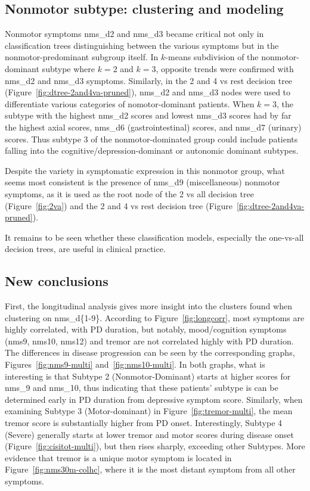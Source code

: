\documentclass[10pt]{article}
\begin{document}
\begin{multicols}{2}
\subsection{Nonmotor subtype: clustering and modeling}
Nonmotor symptoms nms\_d2 and nms\_d3 became critical not only in
classification trees distinguishing between the various symptoms but in the
nonmotor-predominant subgroup itself. In $k$-means subdivision of the
nonmotor-dominant subtype where $k = 2$ and $k = 3$, opposite trends were
confirmed with nms\_d2 and nms\_d3 symptoms. Similarly, in the 2 and 4 vs rest
decision tree (Figure~\ref{fig:dtree-2and4va-pruned}), nms\_d2 and nms\_d3 nodes were
used to differentiate various categories of nomotor-dominant patients.
When $k = 3$, the subtype with the highest nms\_d2 scores and lowest
nms\_d3 scores had by far the highest axial scores, nms\_d6 (gastrointestinal)
scores, and nms\_d7 (urinary) scores. Thus subtype 3 of the nonmotor-dominated
group could include patients falling into the cognitive/depression-dominant or
autonomic dominant subtypes.

Despite the variety in symptomatic expression in this nonmotor group, what
seems most consistent is the presence of nms\_d9 (miscellaneous) nonmotor
symptoms, as it is used as the root node of the 2 vs all decision tree
(Figure~\ref{fig:2va}) and the 2 and 4 vs rest decision tree
(Figure~\ref{fig:dtree-2and4va-pruned}).

It remains to be seen whether these classification models, especially the one-vs-all decision
trees, are useful in clinical practice.

\subsection{New conclusions}
\label{ssec:newconc}

First, the longitudinal analysis gives more insight into the clusters found when clustering on
nms\_d\{1-9\}. According to Figure~\ref{fig:longcorr}, most symptoms are highly correlated, with PD
duration, but notably, mood/cognition symptoms (nms9, nms10, nms12) and tremor are not correlated
highly with PD duration. The differences in disease progression can be seen by the corresponding
graphs, Figures~\ref{fig:nms9-multi} and~\ref{fig:nms10-multi}. In both graphs, what is interesting
is that Subtype 2 (Nonmotor-Dominant) starts at higher scores for nms\_9 and nms\_10, thus
indicating that these patients' subtype is can be determined early in PD duration from depressive
symptom score. Similarly, when examining Subtype 3 (Motor-dominant) in
Figure~\ref{fig:tremor-multi}, the mean tremor score is substantially higher from PD onset.
Interestingly, Subtype 4 (Severe) generally starts at lower tremor and motor scores during disease
onset (Figure~\ref{fig:cisitot-multi}), but then rises sharply, exceeding other Subtypes. More evidence
that tremor is a unique motor symptom is located in Figure~\ref{fig:nms30m-colhc}, where it is the most
distant symptom from all other symptoms.


\end{multicols}
\end{document}
